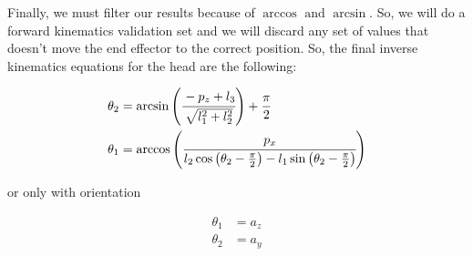 Finally, we must filter our results because of $\arccos\text{ and }\arcsin$. So, we will do a forward kinematics validation set and we will discard any set of values that doesn't move the end effector to the correct position.
So, the final inverse kinematics equations for the head are the following:
\begin{small}
\begin{align*}
\theta_2 &= \arcsin\left(\cfrac{- p_z + l_3}{ \sqrt{l^2_1 + l^2_2} }\right) + \frac{\pi}{2}\\
\theta_1 &= \arccos\left(\cfrac{p_x}{l_2\cos\left(\theta_2 - \frac{\pi}{2}\right) - l_1\sin\left(\theta_2 - \frac{\pi}{2}\right) } \right)
\end{align*}
\end{small}
or only with orientation
\begin{small}
\begin{align*}
\theta_1 &= a_z\\
\theta_2 &= a_y
\end{align*}
\end{small}

